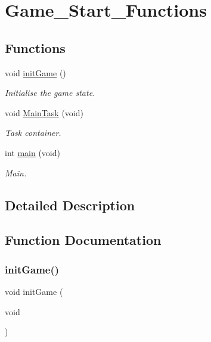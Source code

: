 \hypertarget{group___game___start___functions}{}\section{Game\+\_\+\+Start\+\_\+\+Functions}
\label{group___game___start___functions}
\subsection*{Functions}
\begin{DoxyCompactItemize}
\item 
void \hyperlink{group___game___start___functions_ga486f7b71aa892de0f05c6187647613b9}{init\+Game} ()
\begin{DoxyCompactList}\small\item\em Initialise the game state. \end{DoxyCompactList}\item 
void \hyperlink{group___game___start___functions_gaec7cf19e4225041fa5e3ea90b904b775}{Main\+Task} (void)
\begin{DoxyCompactList}\small\item\em Task container. \end{DoxyCompactList}\item 
int \hyperlink{group___game___start___functions_ga840291bc02cba5474a4cb46a9b9566fe}{main} (void)
\begin{DoxyCompactList}\small\item\em Main. \end{DoxyCompactList}\end{DoxyCompactItemize}


\subsection{Detailed Description}


\subsection{Function Documentation}
\mbox{\label{group___game___start___functions_ga486f7b71aa892de0f05c6187647613b9}} 
\subsubsection{\texorpdfstring{init\+Game()}{initGame()}}
{\footnotesize\ttfamily void init\+Game (\begin{DoxyParamCaption}\item[{void}]{ }\end{DoxyParamCaption})}



